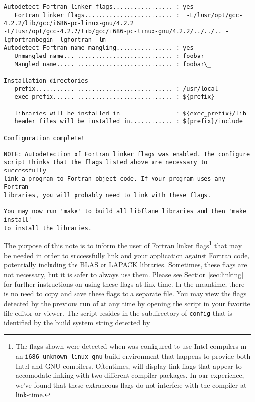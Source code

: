 \begin{Verbatim}[frame=single,framesep=2.5mm,xleftmargin=5mm,commandchars=\\\{\},fontsize=\footnotesize]
Autodetect Fortran linker flags................. : yes
   Fortran linker flags......................... :  -L/lusr/opt/gcc-4.2.2/lib/gcc/i686-pc-linux-gnu/4.2.2
-L/lusr/opt/gcc-4.2.2/lib/gcc/i686-pc-linux-gnu/4.2.2/../../.. -lgfortranbegin -lgfortran -lm
Autodetect Fortran name-mangling................ : yes
   Unmangled name............................... : foobar
   Mangled name................................. : foobar\_

Installation directories
   prefix....................................... : /usr/local
   exec_prefix.................................. : ${prefix}

   libraries will be installed in............... : ${exec_prefix}/lib
   header files will be installed in............ : ${prefix}/include

Configuration complete!

NOTE: Autodetection of Fortran linker flags was enabled. The configure
script thinks that the flags listed above are necessary to successfully
link a program to Fortran object code. If your program uses any Fortran
libraries, you will probably need to link with these flags.

You may now run 'make' to build all libflame libraries and then 'make install'
to install the libraries.
\end{Verbatim}

The purpose of this note is to inform the user of Fortran linker flags\footnote{
The flags shown were detected when \libflame was configured to use Intel
compilers in an {\tt i686-unknown-linux-gnu} build environment that
happens to provide both Intel and GNU compilers.
Oftentimes, \postconfigure will display link flags that appear to accomodate
linking with two different compiler packages.
In our experience, we've found that these extraneous flags do not interfere
with the compiler at link-time.
}
that may be needed in order
to successfully link \libflame and your application against Fortran code,
potentially including the BLAS or LAPACK libraries.
Sometimes, these flags are not necessary, but it is safer to always use them.
Please see Section \ref{sec:linking} for further instructions on using these
flags at link-time.
In the meantime, there is no need to copy and save these flags to a separate
file.
You may view the flags detected by the previous run of \configure at
any time by opening the \postconfigure script in your favorite file editor
or viewer.
The \postconfigure script resides in the subdirectory of {\tt config} that
is identified by the build system string detected by \configurens.

